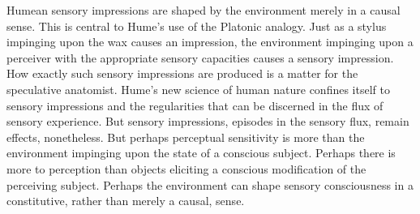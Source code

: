 
Humean sensory impressions are shaped by the environment merely in a causal sense. This is central to Hume's use of the Platonic analogy. Just as a stylus impinging upon the wax causes an impression, the environment impinging upon a perceiver with the appropriate sensory capacities causes a sensory impression. How exactly such sensory impressions are produced is a matter for the speculative a\-na\-to\-mist. Hume's new science of human nature confines itself to sensory impressions and the regularities that can be discerned in the flux of sensory experience. But sensory impressions, episodes in the sensory flux, remain effects, nonetheless. But perhaps perceptual sensitivity is more than the environment impinging upon the state of a conscious subject. Perhaps there is more to perception than objects eliciting a conscious modification of the perceiving subject. Perhaps the environment can shape sensory consciousness in a constitutive, rather than merely a causal, sense.

